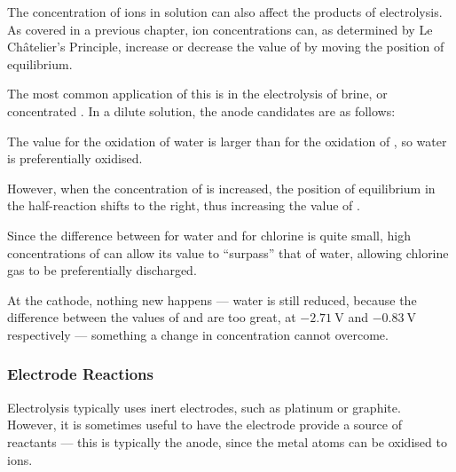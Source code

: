 				The concentration of ions in solution can also affect the products of electrolysis. As covered in a previous chapter,
				ion concentrations can, as determined by Le Châtelier's Principle, increase or decrease the value of \Eo{} by moving
				the position of equilibrium.

				The most common application of this is in the electrolysis of brine, or concentrated . In a dilute solution,
				the anode candidates are as follows:




				The \Eox{} value for the oxidation of water is larger than for the oxidation of , so water is preferentially oxidised.

				However, when the concentration of \ch{\Cl-} is increased, the position of equilibrium in the half-reaction shifts to the
				right, thus increasing the value of \Eox{}.

				Since the difference between \Eox{} for water and for chlorine is quite small, high concentrations of \ch{\Cl-} can allow its
				\Eox{} value to \enquote{surpass} that of water, allowing chlorine gas to be preferentially discharged.

				At the cathode, nothing new happens --- water is still reduced, because the difference between the \Eo{} values of  and
				 are too great, at $\SI{-2.71}{\volt}$ and $\SI{-0.83}{\volt}$ respectively --- something a change in concentration
				cannot overcome.




			\subsubsection{Electrode Reactions}

				Electrolysis typically uses inert electrodes, such as platinum or graphite. However, it is sometimes useful to have the
				electrode provide a source of reactants --- this is typically the anode, since the metal atoms can be oxidised to ions.

